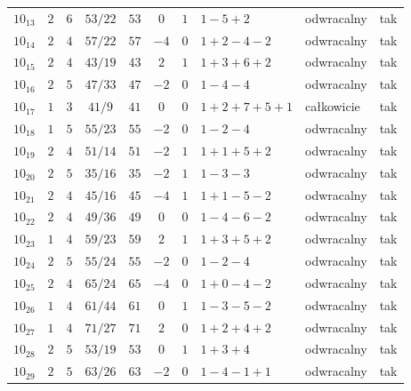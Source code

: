 \begin{longtable}{lccccccllc}
$10_{13}$   &  $2$     &  $6$  &  $53/22$  &  $53$   &  $0$   &  $1$  &  $1-5+2$        &  odwracalny  &  tak  \\
$10_{14}$   &  $2$     &  $4$  &  $57/22$  &  $57$   &  $-4$  &  $0$  &  $1+2-4-2$      &  odwracalny  &  tak  \\
$10_{15}$   &  $2$     &  $4$  &  $43/19$  &  $43$   &  $2$   &  $1$  &  $1+3+6+2$      &  odwracalny  &  tak  \\
$10_{16}$   &  $2$     &  $5$  &  $47/33$  &  $47$   &  $-2$  &  $0$  &  $1-4-4$        &  odwracalny  &  tak  \\
$10_{17}$   &  $1$     &  $3$  &  $41/9$   &  $41$   &  $0$   &  $0$  &  $1+2+7+5+1$    &  całkowicie  &  tak  \\
$10_{18}$   &  $1$     &  $5$  &  $55/23$  &  $55$   &  $-2$  &  $0$  &  $1-2-4$        &  odwracalny  &  tak  \\
$10_{19}$   &  $2$     &  $4$  &  $51/14$  &  $51$   &  $-2$  &  $1$  &  $1+1+5+2$      &  odwracalny  &  tak  \\
$10_{20}$   &  $2$     &  $5$  &  $35/16$  &  $35$   &  $-2$  &  $1$  &  $1-3-3$        &  odwracalny  &  tak  \\
$10_{21}$   &  $2$     &  $4$  &  $45/16$  &  $45$   &  $-4$  &  $1$  &  $1+1-5-2$      &  odwracalny  &  tak  \\
$10_{22}$   &  $2$     &  $4$  &  $49/36$  &  $49$   &  $0$   &  $0$  &  $1-4-6-2$      &  odwracalny  &  tak  \\
$10_{23}$   &  $1$     &  $4$  &  $59/23$  &  $59$   &  $2$   &  $1$  &  $1+3+5+2$      &  odwracalny  &  tak  \\
$10_{24}$   &  $2$     &  $5$  &  $55/24$  &  $55$   &  $-2$  &  $0$  &  $1-2-4$        &  odwracalny  &  tak  \\
$10_{25}$   &  $2$     &  $4$  &  $65/24$  &  $65$   &  $-4$  &  $0$  &  $1+0-4-2$      &  odwracalny  &  tak  \\
$10_{26}$   &  $1$     &  $4$  &  $61/44$  &  $61$   &  $0$   &  $1$  &  $1-3-5-2$      &  odwracalny  &  tak  \\
$10_{27}$   &  $1$     &  $4$  &  $71/27$  &  $71$   &  $2$   &  $0$  &  $1+2+4+2$      &  odwracalny  &  tak  \\
$10_{28}$   &  $2$     &  $5$  &  $53/19$  &  $53$   &  $0$   &  $1$  &  $1+3+4$        &  odwracalny  &  tak  \\
$10_{29}$   &  $2$     &  $5$  &  $63/26$  &  $63$   &  $-2$  &  $0$  &  $1-4-1+1$      &  odwracalny  &  tak  \\

\end{longtable}
